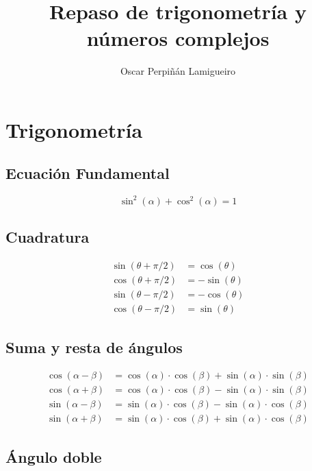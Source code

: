 \documentclass[article, a4paper]{memoir}
\author{Oscar Perpiñán Lamigueiro}
\date{}
\title{Repaso de trigonometría y números complejos}
\begin{document}
\maketitle

\section{Trigonometría}

\subsection{Ecuación Fundamental}

\begin{equation*}
  \sin^2(\alpha) + \cos^2(\alpha) = 1
\end{equation*}

\subsection{Cuadratura}

\begin{align*}
  \sin(\theta + \pi/2) &= \cos(\theta)\\
  \cos(\theta + \pi/2) &= -\sin(\theta)\\
  \sin(\theta - \pi/2) &= -\cos(\theta)\\
  \cos(\theta - \pi/2) &= \sin(\theta)
\end{align*}

\subsection{Suma y resta de ángulos}

\begin{align*}
  \cos(\alpha - \beta) &= \cos(\alpha) \cdot \cos(\beta) + \sin(\alpha) \cdot \sin(\beta)\\
  \cos(\alpha + \beta) &= \cos(\alpha) \cdot \cos(\beta) - \sin(\alpha) \cdot \sin(\beta)\\
  \sin(\alpha - \beta) &= \sin(\alpha) \cdot \cos(\beta) - \sin(\alpha) \cdot \cos(\beta)\\
  \sin(\alpha + \beta) &= \sin(\alpha) \cdot \cos(\beta) + \sin(\alpha) \cdot \cos(\beta)
\end{align*}

\subsection{Ángulo doble}
\end{document}
